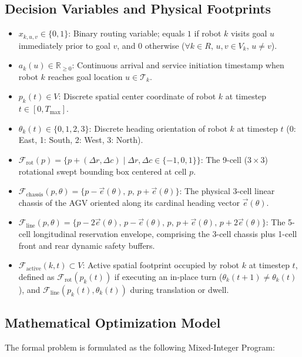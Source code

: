 \documentclass[journal]{IEEEtran}
\begin{document}
\subsection{Decision Variables and Physical Footprints}
\begin{itemize}
    \item $x_{k, u, v} \in \{0, 1\}$: Binary routing variable; equals $1$ if robot $k$ visits goal $u$ immediately prior to goal $v$, and $0$ otherwise ($\forall k \in R, \, u, v \in V_k, \, u \neq v$).
    \item $a_k(u) \in \mathbb{R}_{\ge 0}$: Continuous arrival and service initiation timestamp when robot $k$ reaches goal location $u \in \mathcal{T}_k$.
    \item $p_k(t) \in V$: Discrete spatial center coordinate of robot $k$ at timestep $t \in [0, T_{\max}]$.
    \item $\theta_k(t) \in \{0, 1, 2, 3\}$: Discrete heading orientation of robot $k$ at timestep $t$ (0: East, 1: South, 2: West, 3: North).
    \item $\mathcal{F}_{\text{rot}}(p) = \{p + (\Delta r, \Delta c) \mid \Delta r, \Delta c \in \{-1, 0, 1\}\}$: The 9-cell ($3 \times 3$) rotational swept bounding box centered at cell $p$.
    \item $\mathcal{F}_{\text{chassis}}(p, \theta) = \{p - \vec{e}(\theta), \, p, \, p + \vec{e}(\theta)\}$: The physical 3-cell linear chassis of the AGV oriented along its cardinal heading vector $\vec{e}(\theta)$.
    \item $\mathcal{F}_{\text{line}}(p, \theta) = \{p - 2\vec{e}(\theta), \, p - \vec{e}(\theta), \, p, \, p + \vec{e}(\theta), \, p + 2\vec{e}(\theta)\}$: The 5-cell longitudinal reservation envelope, comprising the 3-cell chassis plus 1-cell front and rear dynamic safety buffers.
    \item $\mathcal{F}_{\text{active}}(k, t) \subset V$: Active spatial footprint occupied by robot $k$ at timestep $t$, defined as $\mathcal{F}_{\text{rot}}(p_k(t))$ if executing an in-place turn ($\theta_k(t+1) \neq \theta_k(t)$), and $\mathcal{F}_{\text{line}}(p_k(t), \theta_k(t))$ during translation or dwell.
\end{itemize}

\subsection{Mathematical Optimization Model}
The formal problem is formulated as the following Mixed-Integer Program:
\end{document}
